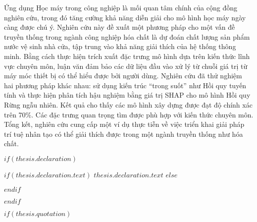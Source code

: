 \begin{abstractVN}
  \begin{center}
    \justifying
    {
      Ứng dụng Học máy trong công nghiệp là mối quan tâm chính của cộng đồng nghiên cứu, trong đó tăng cường khả năng diễn giải cho mô hình học máy ngày càng được chú ý.
      Nghiên cứu này đề xuất một phương pháp cho một vấn đề truyền thống trong ngành công nghiệp hóa chất là dự đoán chất lượng sản phẩm nước vệ sinh nhà cửa, tập trung vào khả năng giải thích của hệ thống thông minh. Bằng cách thực hiện trích xuất đặc trưng mô hình dựa trên kiến thức lĩnh vực chuyên môn, luận văn đảm bảo các dữ liệu đầu vào xử lý từ chuỗi giá trị từ máy móc thiết bị có thể hiểu được bởi người dùng.
      Nghiên cứu đã thử nghiệm hai phương pháp khác nhau: sử dụng kiến trúc “trong suốt” như Hồi quy tuyến tính và thực hiện phân tích hậu nghiệm bằng giá trị SHAP cho mô hình Hồi quy Rừng ngẫu nhiên. Kết quả cho thấy các mô hình xây dựng được đạt độ chính xác trên 70\%. Các đặc trưng quan trọng tìm được phù hợp với kiến thức chuyên môn.
      Tổng kết, nghiên cứu cung cấp một ví dụ thực tiễn về việc triển khai giải pháp trí tuệ nhân tạo có thể giải thích được trong một ngành truyền thống như hóa chất.
    }
  \end{center}
\end{abstractVN}

$if(thesis.declaration)$
\begin{declaration}
\addchaptertocentry{\authorshipname} %
$if(thesis.declaration.text)$
$thesis.declaration.text$
$else$

$endif$

\end{declaration}
\clearpage
$endif$

$if(thesis.quotation)$

\vspace*{0.2\textheight}

